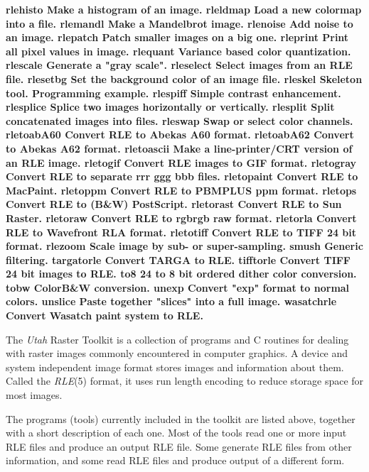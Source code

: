 \nwl
%
\bf rlehisto %
\rm Make a histogram of an image.
\nwl
%
\bf rleldmap %
\rm Load a new colormap into a file.
\nwl
%
\bf rlemandl %
\rm Make a Mandelbrot image.
\nwl
%
\bf rlenoise %
\rm Add noise to an image.
\nwl
%
\bf rlepatch %
\rm Patch smaller images on a big one.
\nwl
%
\bf rleprint %
\rm Print all pixel values in image.
\nwl
%
\bf rlequant %
\rm Variance based color quantization.
\nwl
%
\bf rlescale %
\rm Generate a "gray scale".
\nwl
%
\bf rleselect %
\rm Select images from an RLE file.
\nwl
%
\bf rlesetbg %
\rm Set the background color of an image file.
\nwl
%
\bf rleskel %
\rm Skeleton tool.  Programming example.
\nwl
%
\bf rlespiff %
\rm Simple contrast enhancement.
\nwl
%
\bf rlesplice %
\rm Splice two images horizontally or vertically.
\nwl
%
\bf rlesplit %
\rm Split concatenated images into files.
\nwl
%
\bf rleswap %
\rm Swap or select color channels.
\nwl
%
\bf rletoabA60 %
\rm Convert RLE to Abekas A60 format.
\nwl
%
\bf rletoabA62 %
\rm Convert to Abekas A62 format.
\nwl
%
\bf rletoascii %
\rm Make a line-printer/CRT version of an RLE image.
\nwl
%
\bf rletogif %
\rm Convert RLE images to GIF format.
\nwl
%
\bf rletogray %
\rm Convert RLE to separate rrr ggg bbb files.
\nwl
%
\bf rletopaint %
\rm Convert RLE to MacPaint.
\nwl
%
\bf rletoppm %
\rm Convert RLE to PBMPLUS ppm format.
\nwl
%
\bf rletops %
\rm Convert RLE to (B\&W) PostScript.
\nwl
%
\bf rletorast %
\rm Convert RLE to Sun Raster.
\nwl
%
\bf rletoraw %
\rm Convert RLE to rgbrgb raw format.
\nwl
%
\bf rletorla %
\rm Convert RLE to Wavefront RLA format.
\nwl
%
\bf rletotiff %
\rm Convert RLE to TIFF 24 bit format.
\nwl
%
\bf rlezoom %
\rm Scale image by sub- or super-sampling.
\nwl
%
\bf smush %
\rm Generic filtering.
\nwl
%
\bf targatorle %
\rm Convert TARGA to RLE.
\nwl
%
\bf tifftorle %
\rm Convert TIFF 24 bit images to RLE.
\nwl
%
\bf to8 %
\rm 24 to 8 bit ordered dither color conversion.
\nwl
%
\bf tobw %
\rm ColorB\&W conversion.
\nwl
%
\bf unexp %
\rm Convert "exp" format to normal colors.
\nwl
%
\bf unslice %
\rm Paste together "slices" into a full image.
\nwl
%
\bf wasatchrle %
\rm Convert Wasatch paint system to RLE.

The 
{\it Utah} Raster Toolkit
is a collection of programs and C routines for
dealing with raster images commonly encountered in computer graphics.
A device and system independent image format stores images
and information about them.  Called the 
{\it RLE}{\rm (5)}
format, it uses
run length encoding to reduce storage space for most images.

The programs (tools) currently included in the toolkit are listed above,
together with a short description of each one.  Most of the tools read
one or more input RLE files and produce an output RLE file.  Some
generate RLE files from other information, and some read RLE files and
produce output of a different form.


